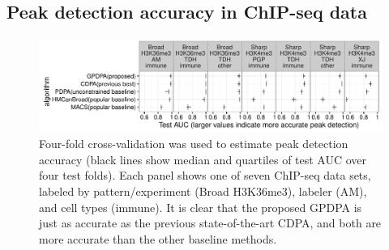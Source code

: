 \documentclass[twoside,11pt]{article}
\begin{document}


\subsection{Peak detection accuracy in ChIP-seq data}


\begin{figure}[t!]
  \centering 
  \includegraphics[width=\textwidth]{figure-test-error-dots}
  \vskip -0.5cm
  \caption{Four-fold cross-validation was used to estimate peak
    detection accuracy (black lines show median and quartiles of test
    AUC over four test folds). Each panel shows one of seven ChIP-seq data
    sets, labeled by pattern/experiment (Broad H3K36me3), labeler
    (AM), and cell types (immune).  It is clear that the proposed
    GPDPA is just as accurate as the previous state-of-the-art CDPA,
    and both are more accurate than the other baseline methods.
  }
  \label{fig:test-error-dots}
\end{figure}
\end{document}
